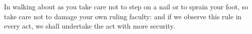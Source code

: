 In walking about as you take care not to step on a nail or to sprain your foot,
so take care not to damage your own ruling faculty: and if we observe this rule
in every act, we shall undertake the act with more security.
